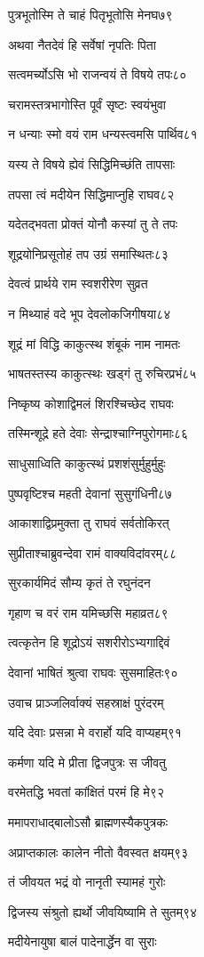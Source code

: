 पुत्रभूतोस्मि ते चाहं पितृभूतोसि मेनघ७९

अथवा नैतदेवं हि सर्वेषां नृपतिः पिता

सत्वमर्च्योऽसि भो राजन्वयं ते विषये तपः८०

चरामस्तत्रभागोस्ति पूर्वं सृष्टः स्वयंभुवा

न धन्याः स्मो वयं राम धन्यस्त्वमसि पार्थिव८१

यस्य ते विषये ह्येवं सिद्धिमिच्छंति तापसाः

तपसा त्वं मदीयेन सिद्धिमाप्नुहि राघव८२

यदेतद्भवता प्रोक्तं योनौ कस्यां तु ते तपः

शूद्रयोनिप्रसूतोहं तप उग्रं समास्थितः८३

देवत्वं प्रार्थये राम स्वशरीरेण सुव्रत

न मिथ्याहं वदे भूप देवलोकजिगीषया८४

शूद्रं मां विद्धि काकुत्स्थ शंबूकं नाम नामतः

भाषतस्तस्य काकुत्स्थः खड्गं तु रुचिरप्रभं८५

निष्कृष्य कोशाद्विमलं शिरश्चिच्छेद राघवः

तस्मिन्शूद्रे हते देवाः सेन्द्राश्चाग्निपुरोगमाः८६

साधुसाध्विति काकुत्स्थं प्रशशंसुर्मुहुर्मुहुः

पुष्पवृष्टिश्च महती देवानां सुसुगंधिनी८७

आकाशाद्विप्रमुक्ता तु राघवं सर्वतोकिरत्

सुप्रीताश्चाब्रुवन्देवा रामं वाक्यविदांवरम्८८

सुरकार्यमिदं सौम्य कृतं ते रघुनंदन

गृहाण च वरं राम यमिच्छसि महाव्रत८९

त्वत्कृतेन हि शूद्रोऽयं सशरीरोऽभ्यगाद्दिवं

देवानां भाषितं श्रुत्वा राघवः सुसमाहितः९०

उवाच प्राञ्जलिर्वाक्यं सहस्राक्षं पुरंदरम्

यदि देवाः प्रसन्ना मे वरार्हो यदि वाप्यहम्९१

कर्मणा यदि मे प्रीता द्विजपुत्रः स जीवतु

वरमेतद्धि भवतां कांक्षितं परमं हि मे९२

ममापराधाद्बालोऽसौ ब्राह्मणस्यैकपुत्रकः

अप्राप्तकालः कालेन नीतो वैवस्वत क्षयम्९३

तं जीवयत भद्रं वो नानृती स्यामहं गुरोः

द्विजस्य संश्रुतो ह्यर्थो जीवयिष्यामि ते सुतम्९४

मदीयेनायुषा बालं पादेनार्द्धेन वा सुराः

